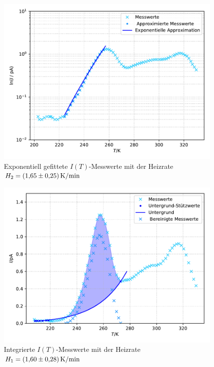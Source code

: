 \begin{figure}[H]
  \centering
  \includegraphics[scale=0.7]{content/plot2.pdf}
  \caption{Exponentiell gefittete $I(T)$-Messwerte mit der Heizrate $H_2 = \SI{1.65 +- 0.25}{\kelvin\per\minute}$}
  \label{fig:plot2}
\end{figure}


\begin{figure}[H]
  \centering
  \includegraphics[scale=0.7]{content/plot3.pdf}
  \caption{Integrierte $I(T)$-Messwerte mit der Heizrate $H_1 = \SI{1.60 +- 0.28}{\kelvin\per\minute}$}
  \label{fig:plot3}
\end{figure}

